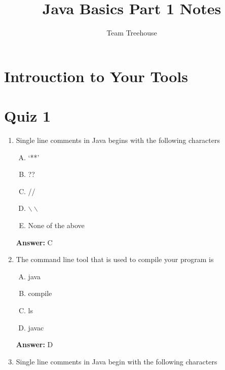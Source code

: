 \documentclass[12pt]{article}
\begin{document}
\title{Java Basics Part 1 Notes}
\author{Team Treehouse}
\maketitle

\section{Introuction to Your Tools}
\section{Quiz 1}

\bigskip

\begin{enumerate}[1.]
    \item

    Single line comments in Java begins with the following characters

    \bigskip

    \begin{enumerate}[A.]
        \item `**'
        \item ??
        \item //
        \item $\backslash\backslash$
        \item None of the above
    \end{enumerate}

    \bigskip

    \textbf{Answer:} C

    \item

    The command line tool that is used to compile your program is

    \bigskip

    \begin{enumerate}[A.]
        \item java
        \item compile
        \item ls
        \item javac
    \end{enumerate}

    \bigskip

    \textbf{Answer:} D

    \item Single line comments in Java begin with the following characters

    \bigskip


\end{enumerate}
\end{document}
